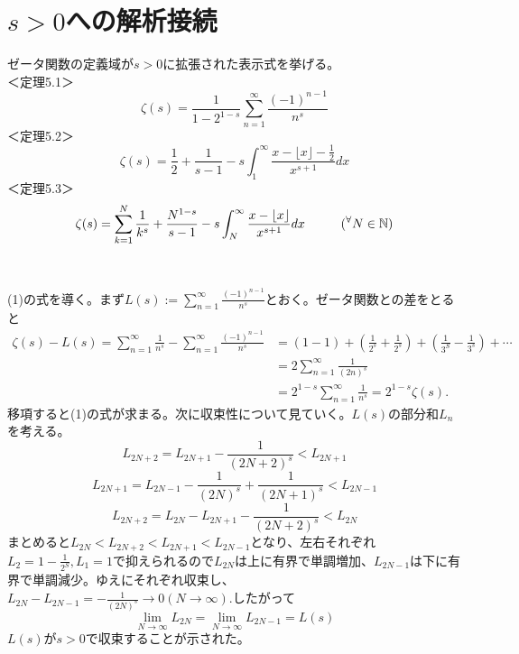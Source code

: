 \documentclass{jsarticle}
\begin{document}
\setcounter{equation}{0}
\section{\(s>0\)への解析接続}
ゼータ関数の定義域が\(s>0\)に拡張された表示式を挙げる。\\
＜定理5.1＞
\begin{equation}
\zeta(s)=\frac{1}{1-2^{1-s}}\sum_{n=1}^{\infty}\frac{(-1)^{n-1}}{n^{s}}
\end{equation}
＜定理5.2＞
\begin{equation}
\zeta(s)=\frac{1}{2}+\frac{1}{s-1}-s\int_{1}^{\infty}\frac{x-\lfloor x\rfloor-\frac{1}{2}}{x^{s+1}}dx
\end{equation}
＜定理5.3＞
\begin{equation}
\zeta(s)=\sum_{k=1}^{N}\frac{1}{k^{s}}+\frac{N^{1-s}}{s-1}-s\int_{N}^{\infty}\frac{x-\lfloor x\rfloor}{x^{s+1}}dx\hspace{10mm}(^\forall N\in\mathbb{N})
\end{equation}\\
\\
(1)の式を導く。まず\(\displaystyle L(s):=\sum_{n=1}^{\infty}\frac{(-1)^{n-1}}{n^{s}}\)とおく。ゼータ関数との差をとると
\begin{align*}
\zeta(s)-L(s)=\sum_{n=1}^{\infty}\frac{1}{n^{s}}-\sum_{n=1}^{\infty}\frac{(-1)^{n-1}}{n^{s}}&=(1-1)+\left(\frac{1}{2^{s}}+\frac{1}{2^{s}}\right)+\left(\frac{1}{3^{S}}-\frac{1}{3^{s}}\right)+\cdots\\
&=2\sum_{n=1}^{\infty}\frac{1}{(2n)^s}\\
&=2^{1-s}\sum_{n=1}^{\infty}\frac{1}{n^s}=2^{1-s}\zeta(s).
\end{align*}
移項すると(1)の式が求まる。次に収束性について見ていく。\(L(s)\)の部分和\(L_{n}\)を考える。
\[L_{2N+2}=L_{2N+1}-\frac{1}{(2N+2)^s}<L_{2N+1}\]
\[L_{2N+1}=L_{2N-1}-\frac{1}{(2N)^{s}}+\frac{1}{(2N+1)^s}<L_{2N-1}\]
\[L_{2N+2}=L_{2N}-L_{2N+1}-\frac{1}{(2N+2)^s}<L_{2N}\]
まとめると\(\displaystyle L_{2N}<L_{2N+2}<L_{2N+1}<L_{2N-1}\)となり、左右それぞれ\(\displaystyle L_{2}=1-\frac{1}{2^{S}},L_{1}=1\)で抑えられるので\(L_{2N}\)は上に有界で単調増加、\(L_{2N-1}\)は下に有界で単調減少。ゆえにそれぞれ収束し、\\
\(\displaystyle L_{2N}-L_{2N-1}=-\frac{1}{(2N)^s}\to0(N\to\infty)\).\hspace{3mm}したがって
\[\lim_{N\to\infty}L_{2N}=\lim_{N\to\infty}L_{2N-1}=L(s)\]
\(L(s)\)が\(s>0\)で収束することが示された。\\
\\
\end{document}
